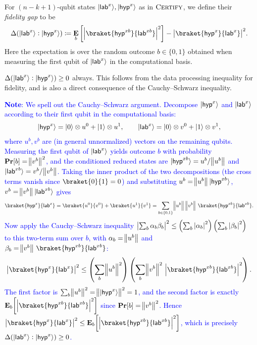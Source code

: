 \begin{definition}
    For $(n-k+1)$-qubit states $\lvert\mathsf{lab}^x\rangle, \lvert\mathsf{hyp}^x\rangle$ as in $\textsc{Certify}$, %
    we define their \emph{fidelity gap} to be%
    \begin{equation*}
        \Delta(\ket{\lab^x}: \ket{\tar^x}) \coloneqq \mathop{\E}_{b}\left[\abs{\braket{\tar^{xb}}{\lab^{xb}}}^2\right]- \abs{\braket{\tar^x}{\lab^x}}^2.
    \end{equation*}
    Here the expectation is over the random outcome $b \in \{0,1\}$ obtained when measuring the first qubit of $\lvert\mathsf{lab}^x\rangle$ in the computational basis. %
\end{definition}
\begin{remark} \label{rem:nonneg}
    $\Delta(\lvert\mathsf{lab}^x\rangle: \lvert\mathsf{hyp}^x\rangle) \geq 0$ always. This follows from the data processing inequality for fidelity, and is also a direct consequence of the Cauchy--Schwarz inequality.
\end{remark}

\textcolor{blue}{\textbf{Note}: We spell out the Cauchy--Schwarz argument. Decompose $\lvert\mathsf{hyp}^x\rangle$ and $\lvert\mathsf{lab}^x\rangle$ according to their first qubit in the computational basis:
\[
    \lvert\mathsf{hyp}^x\rangle = \lvert0\rangle\otimes u^0 + \lvert1\rangle\otimes u^1, \qquad \lvert\mathsf{lab}^x\rangle = \lvert0\rangle\otimes v^0 + \lvert1\rangle\otimes v^1,
\]
where $u^b, v^b$ are (in general unnormalized) vectors on the remaining qubits. Measuring the first qubit of $\lvert\mathsf{lab}^x\rangle$ yields outcome $b$ with probability $\operatorname{{\bf Pr}}[b] = \norm{v^b}^2$, and the conditioned reduced states are $\lvert\mathsf{hyp}^{xb}\rangle = u^b/\norm{u^b}$ and $\lvert\mathsf{lab}^{xb}\rangle = v^b/\norm{v^b}$. Taking the inner product of the two decompositions (the cross terms vanish since $\braket{0}{1} = 0$) and substituting $u^b = \norm{u^b}\lvert\mathsf{hyp}^{xb}\rangle$, $v^b = \norm{v^b}\lvert\mathsf{lab}^{xb}\rangle$ gives
\[
    \braket{\tar^x}{\lab^x} = \braket{u^0}{v^0} + \braket{u^1}{v^1} = \sum_{b \in \{0,1\}} \norm{u^b}\,\norm{v^b}\,\braket{\tar^{xb}}{\lab^{xb}}.
\]
Now apply the Cauchy--Schwarz inequality ${\left| \sum_b \alpha_b \beta_b \right|}^2 \leq \left(\sum_b {\left| \alpha_b \right|}^2\right)\left(\sum_b {\left| \beta_b \right|}^2\right)$ to this two-term sum over $b$, with $\alpha_b = \norm{u^b}$ and $\beta_b = \norm{v^b}\,\braket{\tar^{xb}}{\lab^{xb}}$:
\[
    \abs{\braket{\tar^x}{\lab^x}}^2 \leq \left(\sum_b \norm{u^b}^2\right)\left(\sum_b \norm{v^b}^2\,\abs{\braket{\tar^{xb}}{\lab^{xb}}}^2\right).
\]
The first factor is $\sum_b \norm{u^b}^2 = \norm{\lvert\mathsf{hyp}^x\rangle}^2 = 1$, and the second factor is exactly $\mathop{\E}_b\!\left[\abs{\braket{\tar^{xb}}{\lab^{xb}}}^2\right]$ since $\operatorname{{\bf Pr}}[b] = \norm{v^b}^2$. Hence $\abs{\braket{\tar^x}{\lab^x}}^2 \leq \mathop{\E}_b\!\left[\abs{\braket{\tar^{xb}}{\lab^{xb}}}^2\right]$, which is precisely $\Delta(\lvert\mathsf{lab}^x\rangle : \lvert\mathsf{hyp}^x\rangle) \geq 0$.}


